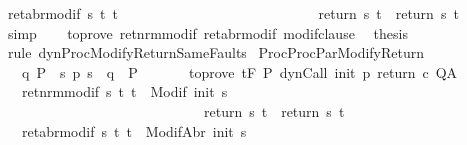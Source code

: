 \begin{isabellebody}
\ ret{\isacharunderscore}abr{\isacharunderscore}modif{\isacharprime}{\isacharcolon}\ {\isachardoublequoteopen}{\isasymforall}s\ t{\isachardot}\ t\ {\isasymin}\ {\isacharbraceleft}{\isacharbraceright}\ \isanewline
\ \ \ \ \ \ \ \ \ \ \ \ \ \ \ \ \ \ \ \ \ \ \ \ {\isasymlongrightarrow}\ return{\isacharprime}\ s\ t\ {\isacharequal}\ return\ s\ t{\isachardoublequoteclose}\isanewline
\ \ \ \ \isamarkupfalse%
\ simp\isanewline
\ \ \isamarkupfalse%
\ to{\isacharunderscore}prove\ ret{\isacharunderscore}nrm{\isacharunderscore}modif{\isacharprime}\ ret{\isacharunderscore}abr{\isacharunderscore}modif{\isacharprime}\ modif{\isacharunderscore}clause\ \isamarkupfalse%
\ {\isacharquery}thesis\isanewline
\ \ \ \ \isamarkupfalse%
\ {\isacharparenleft}rule\ dynProcModifyReturnSameFaults{\isacharparenright}\isanewline
{}\isamarkupfalse%
%
\endisatagproof
{\isafoldproof}%
%
\isadelimproof
\isanewline
%
\endisadelimproof
\isanewline
{}\isamarkupfalse%
\ ProcProcParModifyReturn{\isacharcolon}\ \isanewline
\ \ \ q{\isacharcolon}\ {\isachardoublequoteopen}P\ {\isasymsubseteq}\ {\isacharbraceleft}s{\isachardot}\ p\ s\ {\isacharequal}\ q{\isacharbraceright}\ {\isasyminter}\ P{\isacharprime}{\isachardoublequoteclose}\isanewline
\ \ \ %
\isanewline
\ \ \ to{\isacharunderscore}prove{\isacharcolon}\ {\isachardoublequoteopen}{\isasymGamma}{\isacharcomma}{\isasymTheta}{\isasymturnstile}\isactrlsub t\isactrlbsub {\isacharslash}F\isactrlesub \ P{\isacharprime}\ {\isacharparenleft}dynCall\ init\ p\ return{\isacharprime}\ c{\isacharparenright}\ Q{\isacharcomma}A{\isachardoublequoteclose}\isanewline
\ \ \ ret{\isacharunderscore}nrm{\isacharunderscore}modif{\isacharcolon}\ {\isachardoublequoteopen}{\isasymforall}s\ t{\isachardot}\ t\ {\isasymin}\ {\isacharparenleft}Modif\ {\isacharparenleft}init\ s{\isacharparenright}{\isacharparenright}\ \isanewline
\ \ \ \ \ \ \ \ \ \ \ \ \ \ \ \ \ \ \ \ \ \ \ \ \ \ \ \ {\isasymlongrightarrow}\ return{\isacharprime}\ s\ t\ {\isacharequal}\ return\ s\ t{\isachardoublequoteclose}\isanewline
\ \ \ ret{\isacharunderscore}abr{\isacharunderscore}modif{\isacharcolon}\ {\isachardoublequoteopen}{\isasymforall}s\ t{\isachardot}\ t\ {\isasymin}\ {\isacharparenleft}ModifAbr\ {\isacharparenleft}init\ s{\isacharparenright}{\isacharparenright}\ \isanewline

\end{isabellebody}

